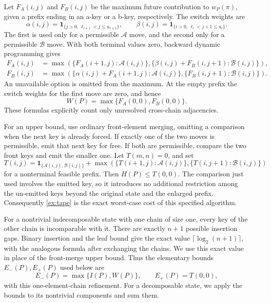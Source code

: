 \documentclass[11pt]{article}
\theoremstyle{definition}
\theoremstyle{remark}
\begin{document}
Let $F_A(i,j)$ and $F_B(i,j)$ be the maximum future contribution to
$w_P(\pi)$, given a prefix ending in an a-key or a b-key, respectively.
The switch weights are
\[
 \alpha(i,j)=\mathbf 1_{\{j>0,\ \ell_{i+1}<j\le u_{i+1}\}},\qquad
 \beta(i,j)=\mathbf 1_{\{i>0,\ \ell_i<j+1\le u_i\}}.
\]
The first is used only for a permissible $\mathcal A$ move, and the second
only for a permissible $\mathcal B$ move.  With both terminal values zero,
backward dynamic programming gives
\begin{align}
 F_A(i,j)&=\max\left(
 \{F_A(i+1,j):\mathcal A(i,j)\},
 \{\beta(i,j)+F_B(i,j+1):\mathcal B(i,j)\}\right),\label{ex:wa}\\
 F_B(i,j)&=\max\left(
 \{\alpha(i,j)+F_A(i+1,j):\mathcal A(i,j)\},
 \{F_B(i,j+1):\mathcal B(i,j)\}\right).\label{ex:wb}
\end{align}
An unavailable option is omitted from the maximum.  At the empty prefix the
switch weights for the first move are zero, and hence
\[
                     W(P)=\max\{F_A(0,0),F_B(0,0)\}.
\]
These formulas explicitly count only unresolved cross-chain adjacencies.

For an upper bound, use ordinary front-element merging, omitting a comparison
when the next key is already forced.  If exactly one of the two moves is
permissible, emit that next key for free.  If both are permissible, compare
the two front keys and emit the smaller one.  Let $T(m,n)=0$, and set
\begin{equation}\label{ex:tape}
 T(i,j)=\mathbf 1_{\{\mathcal A(i,j),\mathcal B(i,j)\}}
       +\max\left(\{T(i+1,j):\mathcal A(i,j)\},
                   \{T(i,j+1):\mathcal B(i,j)\}\right)
\end{equation}
for a nonterminal feasible prefix.  Then $H(P)\le T(0,0)$.
The comparison just used involves the emitted key, so it introduces no
additional restriction among the un-emitted keys beyond the original state
and the enlarged prefix.  Consequently \eqref{ex:tape} is the exact
worst-case cost of this specified algorithm.

For a nontrivial indecomposable state with one chain of size one, every key
of the other chain is incomparable with it.  There are exactly $n+1$
possible insertion gaps.  Binary insertion and the leaf bound give the exact
value $\lceil\log_2(n+1)\rceil$, with the analogous formula after exchanging
the chains.  We use this exact value in place of the front-merge upper bound.
Thus the elementary bounds $E_-(P),E_+(P)$ used below are
\[
 E_-(P)=\max\{I(P),W(P)\},\qquad E_+(P)=T(0,0),
\]
with this one-element-chain refinement.  For a decomposable state, we apply
the bounds to its nontrivial components and sum them.
\end{document}
